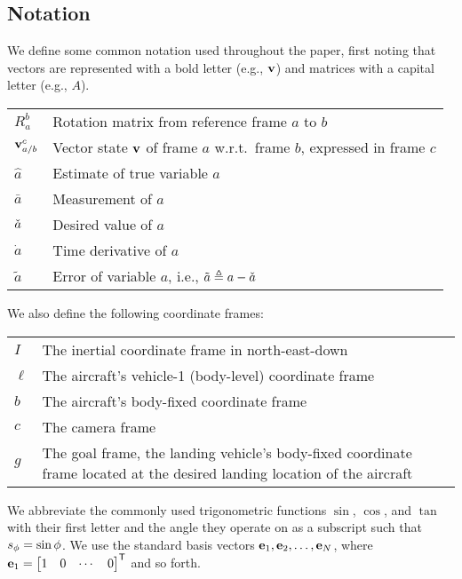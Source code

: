 
\subsection{Notation}

We define some common notation used throughout the paper, first noting that
vectors are represented with a bold letter (e.g., $\bf v$) and matrices with a
capital letter (e.g., $A$).
\begin{center}
\begin{tabularx}{\columnwidth}{lX}
$R_a^b$ & Rotation matrix from reference frame $a$ to $b$ \\
$\boldsymbol{\mathrm{v}}_{a/b}^c$ & Vector state $\boldsymbol{\mathrm{v}}$ of frame $a$ w.r.t.~frame $b$, expressed in frame $c$ \\
$\hat{a}$ & Estimate of true variable $a$ \\
$\bar{a}$ & Measurement of $a$ \\
$\check{a}$ & Desired value of $a$ \\
$\dot{a}$ & Time derivative of $a$ \\
$\tilde{a}$ & Error of variable $a$, i.e., $\tilde{a} \triangleq a - \check{a}$
\end{tabularx}
\end{center}
%
We also define the following coordinate frames:
\begin{center}
\begin{tabularx}{\columnwidth}{lX}
$I$ & The inertial coordinate frame in north-east-down\\
$\ell$ & The aircraft's vehicle-1 (body-level) coordinate frame \\
$b$ & The aircraft's body-fixed coordinate frame \\
$c$ & The camera frame \\
$g$ & The goal frame, the landing vehicle's body-fixed coordinate frame located at the desired landing location of the aircraft
\end{tabularx}
\end{center}


We abbreviate the commonly used trigonometric functions $\sin$, $\cos$, and
$\tan$ with their first letter and the angle they operate on as a subscript
such that $s_\phi = \sin\phi$.
We use the standard basis vectors $\boldsymbol{\mathrm{e}}_1, \boldsymbol{\mathrm{e}}_2, \ldots, \boldsymbol{\mathrm{e}}_N$,
where $\boldsymbol{\mathrm{e}}_1 = \begin{bmatrix} 1 & 0 & \cdots & 0 \end{bmatrix}^{\mathsf{T}}$
and so forth.
